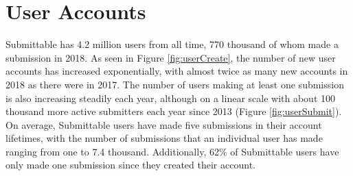 \documentclass[12pt]{report}   %
\begin{document}
\section{User Accounts}
Submittable has 4.2 million users from all time, 770 thousand of whom made a submission in 2018. As seen in Figure \ref{fig:userCreate}, the number of new user accounts has increased exponentially, with almost twice as many new accounts in 2018 as there were in 2017. The number of users making at least one submission is also increasing steadily each year, although on a linear scale with about 100 thousand more active submitters each year since 2013 (Figure \ref{fig:userSubmit}). On average, Submittable users have made five submissions in their account lifetimes, with the number of submissions that an individual user has made ranging from one to 7.4 thousand. Additionally, 62\% of Submittable users have only made one submission since they created their account.
\end{document}
